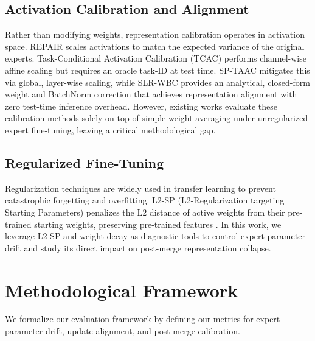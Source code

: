 \documentclass{article}
\theoremstyle{plain}
\theoremstyle{definition}
\theoremstyle{remark}
\begin{document}
\subsection{Activation Calibration and Alignment}
Rather than modifying weights, representation calibration operates in activation space. REPAIR \cite{Jordan2023} scales activations to match the expected variance of the original experts. Task-Conditional Activation Calibration (TCAC) \cite{Anonymous2024b} performs channel-wise affine scaling but requires an oracle task-ID at test time. SP-TAAC \cite{Anonymous2023} mitigates this via global, layer-wise scaling, while SLR-WBC \cite{Anonymous2024c} provides an analytical, closed-form weight and BatchNorm correction that achieves representation alignment with zero test-time inference overhead. However, existing works evaluate these calibration methods solely on top of simple weight averaging under unregularized expert fine-tuning, leaving a critical methodological gap.

\subsection{Regularized Fine-Tuning}
Regularization techniques are widely used in transfer learning to prevent catastrophic forgetting and overfitting. L2-SP (L2-Regularization targeting Starting Parameters) penalizes the L2 distance of active weights from their pre-trained starting weights, preserving pre-trained features \cite{Li2018}. In this work, we leverage L2-SP and weight decay as diagnostic tools to control expert parameter drift and study its direct impact on post-merge representation collapse.

\section{Methodological Framework}

We formalize our evaluation framework by defining our metrics for expert parameter drift, update alignment, and post-merge calibration.
\end{document}
